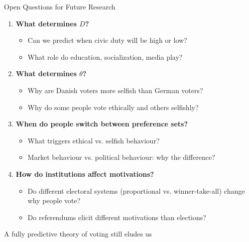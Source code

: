 \documentclass[10pt]{beamer}
\begin{document}
\begin{frame}{Open Questions for Future Research}
\begin{enumerate}
\item \textbf{What determines $D$?}
\begin{itemize}
\item Can we predict when civic duty will be high or low?
\item What role do education, socialization, media play?
\end{itemize}

\item \textbf{What determines $\theta$?}
\begin{itemize}
\item Why are Danish voters more selfish than German voters?
\item Why do some people vote ethically and others selfishly?
\end{itemize}

\item \textbf{When do people switch between preference sets?}
\begin{itemize}
\item What triggers ethical vs. selfish behaviour?
\item Market behaviour vs. political behaviour: why the difference?
\end{itemize}

\item \textbf{How do institutions affect motivations?}
\begin{itemize}
\item Do different electoral systems (proportional vs. winner-take-all) change why people vote?
\item Do referendums elicit different motivations than elections?
\end{itemize}
\end{enumerate}


A fully predictive theory of voting still eludes us
\end{frame}
\end{document}
